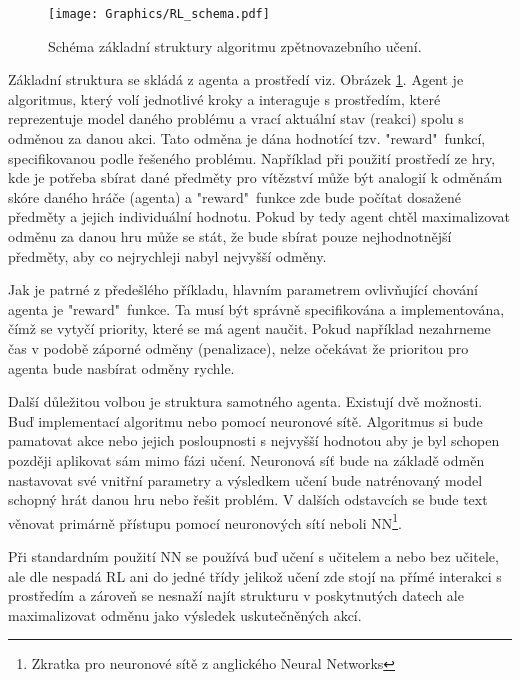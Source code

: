 \documentclass[czech, bc, kky, he, iso690numb]{fasthesis}
\begin{document}
            	\begin{figure}[h]
            		\centering
            		\texttt{[image: Graphics/RL\_schema.pdf]}
            		\caption{Schéma základní struktury algoritmu zpětnovazebního učení.}
            		\label{pic:RL_agent}
            	\end{figure}
            
            Základní struktura se skládá z agenta a prostředí viz. Obrázek \ref{pic:RL_agent}. Agent je algoritmus, který volí jednotlivé kroky a interaguje s prostředím, které reprezentuje model daného problému a vrací aktuální stav (reakci) spolu s odměnou za danou akci. Tato odměna je dána hodnotící tzv. "reward"\ funkcí, specifikovanou podle řešeného problému. Například při použití prostředí ze hry, kde je potřeba sbírat dané předměty pro vítězství může být analogií k odměnám skóre daného hráče (agenta) a "reward"\ funkce zde bude počítat dosažené předměty a jejich individuální hodnotu. Pokud by tedy agent chtěl maximalizovat odměnu za danou hru může se stát, že bude sbírat pouze nejhodnotnější předměty, aby co nejrychleji nabyl nejvyšší odměny.
            
            Jak je patrné z předešlého příkladu, hlavním parametrem ovlivňující chování agenta je "reward"\ funkce. Ta musí být správně specifikována a implementována, čímž se vytyčí priority, které se má agent naučit. Pokud například nezahrneme čas v podobě záporné odměny (penalizace), nelze očekávat že prioritou pro agenta bude nasbírat odměny rychle.
            
            Další důležitou volbou je struktura samotného agenta. Existují dvě možnosti. Buď implementací algoritmu nebo pomocí neuronové sítě. Algoritmus si bude pamatovat akce nebo jejich posloupnosti s nejvyšší hodnotou aby je byl schopen později aplikovat sám mimo fázi učení. Neuronová síť bude na základě odměn nastavovat své vnitřní parametry a výsledkem učení bude natrénovaný model schopný hrát danou hru nebo řešit problém. V dalších odstavcích se bude text věnovat primárně přístupu pomocí neuronových sítí neboli NN\footnote{Zkratka pro neuronové sítě z anglického Neural Networks}.
            
            Při standardním použití NN se používá buď učení s učitelem a nebo bez učitele, ale dle \cite[p.~2]{RLbook} nespadá RL ani do jedné třídy jelikož učení zde stojí na přímé interakci s prostředím a zároveň se nesnaží najít strukturu v poskytnutých datech ale maximalizovat odměnu jako výsledek uskutečněných akcí.
            
\end{document}
